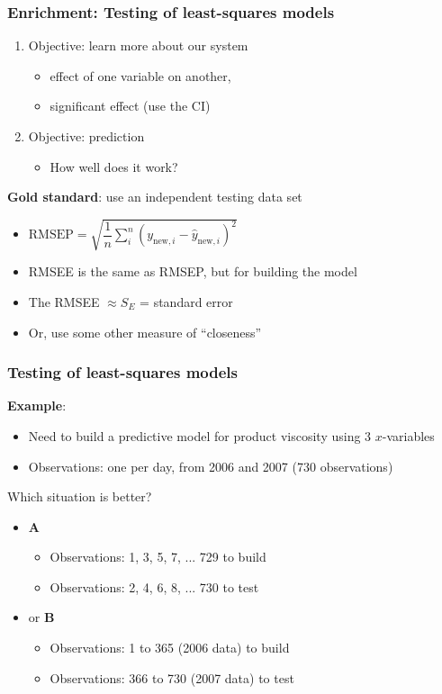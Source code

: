\begin{frame}\frametitle{Enrichment: Testing of least-squares models}
	\begin{enumerate}
		\item	Objective: learn more about our system
		\begin{itemize}
			\item	effect of one variable on another,
			\item	significant effect (use the CI)
		\end{itemize}
		\item	Objective: prediction
		\begin{itemize}
			\item	How well does it work?
		\end{itemize}
	\end{enumerate}

	\textbf{Gold standard}: use an independent testing data set
	\begin{itemize}
		\item	$\text{RMSEP} = \sqrt{\dfrac{1}{n}\sum_{i}^{n}{\left(y_{\text{new}, i} - \hat{y}_{\text{new}, i}\right)^2}}$
		\item	RMSEE is the same as RMSEP, but for building the model
		\item	The RMSEE $\approx S_E$ = standard error
		\item	Or, use some other measure of ``closeness''
	\end{itemize}
\end{frame}

\begin{frame}\frametitle{Testing of least-squares models}

	\textbf{Example}:
	\begin{itemize}
		\item	Need to build a predictive model for product viscosity using 3 $x$-variables
		\item	Observations: one per day, from 2006 and 2007 (730 observations)
	\end{itemize}

	Which situation is better?
	\begin{itemize}
		\item	\textbf{A}
		\begin{itemize}
			\item	Observations: 1, 3, 5, 7, ... 729 to build
			\item	Observations: 2, 4, 6, 8, ... 730 to test
		\end{itemize}
		\item	or \textbf{B}
		\begin{itemize}
			\item	Observations: 1 to 365 (2006 data) to build
			\item	Observations: 366 to 730 (2007 data) to test
		\end{itemize}
	\end{itemize}
\end{frame}

